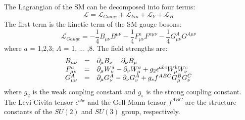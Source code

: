 \documentclass[thesis.tex]{subfiles}
\begin{document}
The Lagrangian of the SM can be decomposed into four terms: 
	\begin{equation}
		\mathcal{L} =  \mathcal{L}_{Gauge} + \mathcal{L}_{kin} + \mathcal{L}_{Y} + \mathcal{L}_{H}
		\label{eq:SMLagrangian}
	\end{equation}
The first term is the kinetic term of the SM gauge bosons:
	\begin{equation} 
		\mathcal{L}_{Gauge} = -\frac{1}{4}B_{\mu\nu} B^{\mu\nu} - \frac{1}{4}F_{\mu\nu}^a F^{a \mu\nu} - \frac{1}{4} G_{\mu\nu}^A G^{A \mu\nu}
	\end{equation}
where $a$ = 1,2,3; $A$ = 1, ... ,8. The field strengths are:
	\begin{equation}
		\begin{array}{c c l}
			B_{\mu\nu} & = & \partial_\mu B_\nu - \partial_\nu B_\mu \\
			F_{\mu\nu}^a &=&  \partial_\mu W_\nu^a - \partial_\nu W_\mu^a + g_2 \epsilon^{abc}W_\mu^b W_\nu^c \\
			G_{\mu\nu}^A &=& \partial_\mu G_\nu^A - \partial_\nu G_\nu^A + g_s f^{ABC}G_{\mu}^B G_{\nu}^C 
		\end{array}
	\end{equation}
where $g_2$ is the weak coupling constant and $g_s$ is the strong coupling constant.
The Levi-Civita tensor $\epsilon^{abc}$ and the Gell-Mann tensor $f^{ABC}$ are the structure constants of the $SU(2)$ and $SU(3)$ group, respectively. 
		
\end{document}
